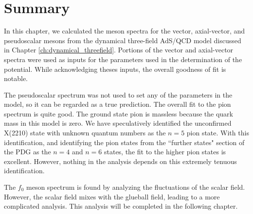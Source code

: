 \section{Summary}
In this chapter, we calculated the meson spectra for the vector, axial-vector, and pseudoscalar mesons from the dynamical three-field AdS/QCD model discussed in Chapter \ref{ch:dynamical_threefield}. 
Portions of the vector and axial-vector spectra were used as inputs for the parameters used in the determination of the potential.
While acknowledging theses inputs, the overall goodness of fit is notable.

The pseudoscalar spectrum was not used to set any of the parameters in the model, so it can be regarded as a true prediction. 
The overall fit to the pion spectrum is quite good.
The ground state pion is massless because the quark mass in this model is zero.
We have speculatively identified the unconfirmed X(2210) state with unknown quantum numbers as the $n=5$ pion state.
With this identification, and identifying the pion states from the ``further states" section of the PDG as the $n=4$ and $n=6$ states, the fit to the higher pion states is excellent.
However, nothing in the analysis depends on this extremely tenuous identification.

The $f_0$ meson spectrum is found by analyzing the fluctuations of the scalar field. 
However, the scalar field mixes with the glueball field, leading to a more complicated analysis.
This analysis will be completed in the following chapter.
